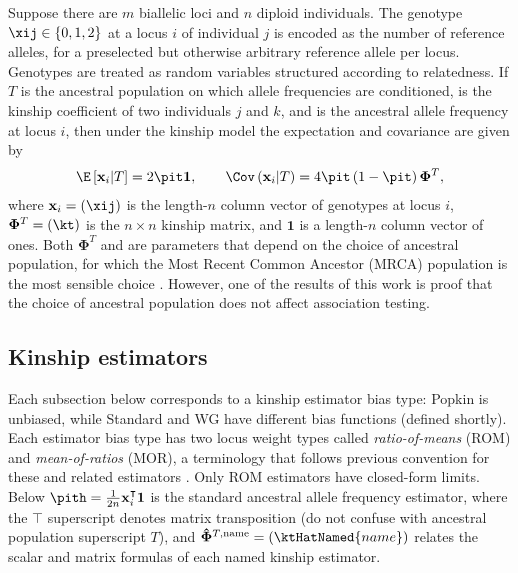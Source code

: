 \documentclass[11pt]{article}
\newcommand{\kinMat}[1][T]{%
  \ensuremath{%
    \mathbf{\Phi}^{#1}
  }%
  \xspace%
}%
\newcommand{\kinMatEstNamed}[1]{%
  \ensuremath{%
    \mathbf{\hat{\Phi}}^{T,\text{#1}}
  }%
  \xspace%
}%
\begin{document}
Suppose there are $m$ biallelic loci and $n$ diploid individuals.
The genotype $\xij \in \{0,1,2\}$ at a locus $i$ of individual $j$ is encoded as the number of reference alleles, for a preselected but otherwise arbitrary reference allele per locus.
Genotypes are treated as random variables structured according to relatedness.
If $T$ is the ancestral population on which allele frequencies are conditioned, \kt is the kinship coefficient of two individuals $j$ and $k$, and \pit is the ancestral allele frequency at locus $i$, then under the kinship model \citep{malecot_mathematiques_1948, wright_genetical_1949, jacquard_structures_1970, astle_population_2009, ochoa_estimating_2021} the expectation and covariance are given by
\begin{align*}
  \E \left[ \mathbf{x}_i \middle| T \right]
  =
    2 \pit \mathbf{1}
  ,
  \quad\quad
  \Cov \left(\mathbf{x}_i \middle| T \right)
  =
    4 \pit \left( 1 - \pit \right) \kinMat
    ,
\end{align*}
where $\mathbf{x}_i = (\xij)$ is the length-$n$ column vector of genotypes at locus $i$, $\kinMat = (\kt)$ is the $n \times n$ kinship matrix, and $\mathbf{1}$ is a length-$n$ column vector of ones.
Both \kinMat and \pit are parameters that depend on the choice of ancestral population, for which the Most Recent Common Ancestor (MRCA) population is the most sensible choice \citep{ochoa_estimating_2021}.
However, one of the results of this work is proof that the choice of ancestral population does not affect association testing.

\subsection{Kinship estimators}

Each subsection below corresponds to a kinship estimator bias type: Popkin is unbiased, while Standard and WG have different bias functions (defined shortly).
Each estimator bias type has two locus weight types called \textit{ratio-of-means} (ROM) and \textit{mean-of-ratios} (MOR), a terminology that follows previous convention for these and related estimators \citep{bhatia_estimating_2013, ochoa_estimating_2021}.
Only ROM estimators have closed-form limits.
Below
$
\pith
=
\frac{1}{2n} \mathbf{x}_i^\intercal \mathbf{1}
$
is the standard ancestral allele frequency estimator,
where the $\intercal$ superscript denotes matrix transposition (do not confuse with ancestral population superscript $T$),
and
$\kinMatEstNamed{name} = (\ktHatNamed{name})$
relates the scalar and matrix formulas of each named kinship estimator.
\end{document}
